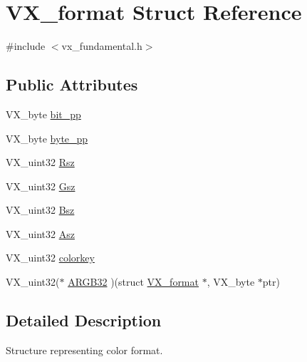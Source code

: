 \hypertarget{structVX__format}{\section{V\-X\-\_\-format Struct Reference}
\label{structVX__format}
}


{\ttfamily \#include $<$vx\-\_\-fundamental.\-h$>$}

\subsection*{Public Attributes}
\begin{DoxyCompactItemize}
\item 
V\-X\-\_\-byte \hyperlink{structVX__format_ac3c60bc6d9b514af42bcdd317f95aa7f}{bit\-\_\-pp}
\item 
V\-X\-\_\-byte \hyperlink{structVX__format_ab8b944e1dee823f20fc1fbb20a3ffc2d}{byte\-\_\-pp}
\item 
V\-X\-\_\-uint32 \hyperlink{structVX__format_a859b157f238ed3495a926a866077313e}{Rsz}
\item 
V\-X\-\_\-uint32 \hyperlink{structVX__format_a3c77f13c487325f5cd424e8d2f630fd4}{Gsz}
\item 
V\-X\-\_\-uint32 \hyperlink{structVX__format_a0c77f4eb51f10ef17e4826d9bb1fedcb}{Bsz}
\item 
V\-X\-\_\-uint32 \hyperlink{structVX__format_a51927e3b58188b62c7ab5538ab9a9653}{Asz}
\item 
V\-X\-\_\-uint32 \hyperlink{structVX__format_ad1f7e23d7858315574c57c6bafac8d39}{colorkey}
\item 
V\-X\-\_\-uint32($\ast$ \hyperlink{structVX__format_ad6bed9f8736501502c0e00548bdb08b8}{A\-R\-G\-B32} )(struct \hyperlink{structVX__format}{V\-X\-\_\-format} $\ast$, V\-X\-\_\-byte $\ast$ptr)
\end{DoxyCompactItemize}


\subsection{Detailed Description}
Structure representing color format. 


